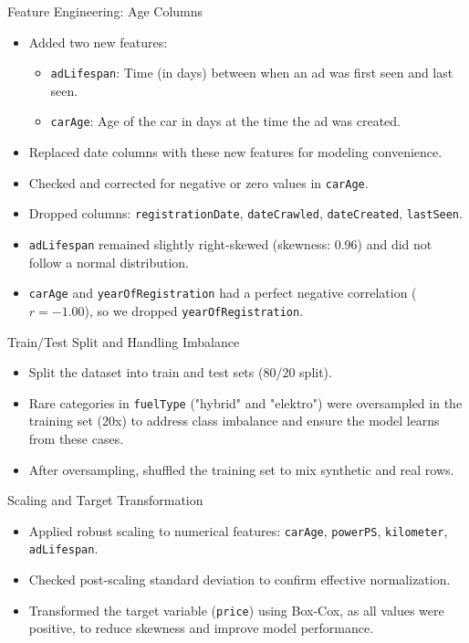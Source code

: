 \documentclass{beamer}
\begin{document}
\begin{frame}{Feature Engineering: Age Columns}
    \begin{itemize}
        \item Added two new features:
        \begin{itemize}
            \item \texttt{adLifespan}: Time (in days) between when an ad was first seen and last seen.
            \item \texttt{carAge}: Age of the car in days at the time the ad was created.
        \end{itemize}
        \item Replaced date columns with these new features for modeling convenience.
        \item Checked and corrected for negative or zero values in \texttt{carAge}.
        \item Dropped columns: \texttt{registrationDate}, \texttt{dateCrawled}, \texttt{dateCreated}, \texttt{lastSeen}.
        \item \texttt{adLifespan} remained slightly right-skewed (skewness: 0.96) and did not follow a normal distribution.
        \item \texttt{carAge} and \texttt{yearOfRegistration} had a perfect negative correlation ($r = -1.00$), so we dropped \texttt{yearOfRegistration}.
    \end{itemize}
\end{frame}

\begin{frame}{Train/Test Split and Handling Imbalance}
    \begin{itemize}
        \item Split the dataset into train and test sets (80/20 split).
        \item Rare categories in \texttt{fuelType} ("hybrid" and "elektro") were oversampled in the training set (20x) to address class imbalance and ensure the model learns from these cases.
        \item After oversampling, shuffled the training set to mix synthetic and real rows.
    \end{itemize}
\end{frame}

\begin{frame}{Scaling and Target Transformation}
    \begin{itemize}
        \item Applied robust scaling to numerical features: \texttt{carAge}, \texttt{powerPS}, \texttt{kilometer}, \texttt{adLifespan}.
        \item Checked post-scaling standard deviation to confirm effective normalization.
        \item Transformed the target variable (\texttt{price}) using Box-Cox, as all values were positive, to reduce skewness and improve model performance.
    \end{itemize}
\end{frame}
\end{document}
